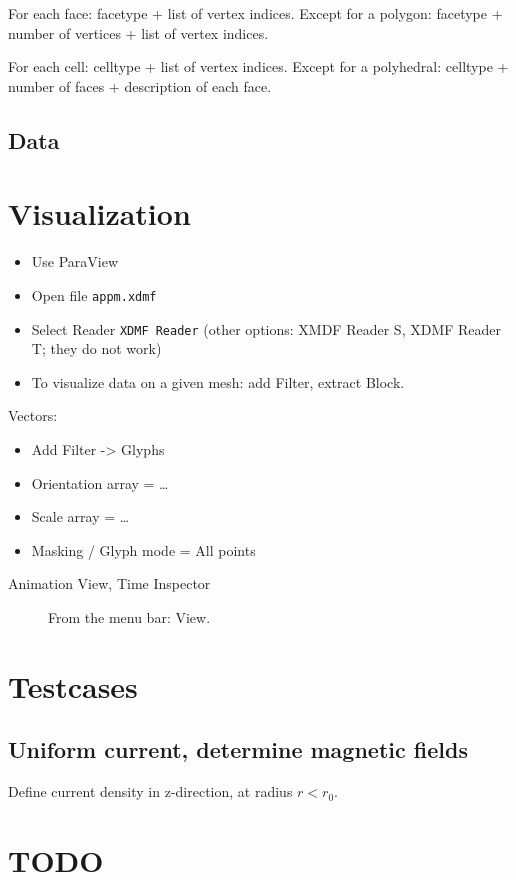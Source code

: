 \documentclass{article}
\begin{document}
For each face: facetype + list of vertex indices. Except for a polygon: facetype + number of vertices + list of vertex indices.

For each cell: celltype + list of vertex indices. Except for a polyhedral: celltype + number of faces + description of each face.




\subsection{Data}


\section{Visualization}

\begin{itemize}
\item Use ParaView
\item Open file \texttt{appm.xdmf}
\item Select Reader \texttt{XDMF Reader} (other options: XMDF Reader S, XDMF Reader T; they do not work)

\item To visualize data on a given mesh: add Filter, extract Block.
\end{itemize}


Vectors:

\begin{itemize}
\item Add Filter -> Glyphs
\item Orientation array = \ldots
\item Scale array = \ldots
\item Masking / Glyph mode = All points
\end{itemize}

\begin{description}
\item[Animation View, Time Inspector]
From the menu bar: View. 
\end{description}



\section{Testcases}


\subsection{Uniform current, determine magnetic fields}

Define current density in z-direction, at radius $r < r_0$. 





\section{TODO}


\end{document}
